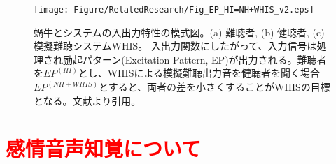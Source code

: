 
\begin{figure}[t]
   \vspace{-50pt}
   \centerline{\texttt{[image: Figure/RelatedResearch/Fig\_EP\_HI=NH+WHIS\_v2.eps]}}
   \vspace{0pt}
   \caption{蝸牛とシステムの入出力特性の模式図。(a) 難聴者, (b) 健聴者, (c) 模擬難聴システムWHIS。
   入出力関数にしたがって、入力信号は処理され励起パターン(Excitation Pattern, EP)が出力される。難聴者を$EP^{(HI)}$とし、WHISによる模擬難聴出力音を健聴者を聞く場合$EP^{(NH+WHIS)}$とすると、両者の差を小さくすることがWHISの目標となる。文献\cite{irino2023hearing}より引用。
 }
 \vspace{-15pt}
 \label{fig:EP_HI=NH+WHIS}
 \end{figure}




\clearpage
\section{\textcolor{red}{感情音声知覚について}}

